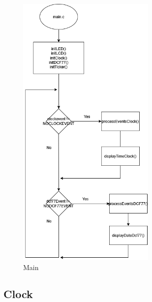 \documentclass[a4paper,12pt]{article}
\begin{document}
\begin{figure}[H]
    \centering
    \includegraphics[width=0.6\textwidth]{diagrams/2.Main.png}
    \caption{Main}
    \label{fig:Main}
\end{figure}


\subsection{Clock}
\end{document}
